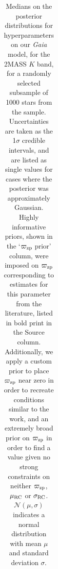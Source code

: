 \documentclass[fleqn,usenatbib]{mnras}
\newcommand{\oozp}{\mbox{$\varpi_{\rm zp}$}\xspace}
\newcommand{\murc}{\mbox{$\mu_{\rm RC}$}\xspace}
\newcommand{\sigrc}{\mbox{$\sigma_{\rm RC}$}\xspace}
\newcommand{\gaia}{\emph{Gaia}\xspace}
\newcommand{\nnew}[1]{#1}
\begin{document}
\begin{table}
\begin{tabular}{llrrrrrr}
    \bottomrule
    \end{tabular}
\caption{Medians on the posterior distributions for hyperparameters on our \gaia model, for the 2MASS $K$ band, for a randomly selected subsample of 1000 stars from the  sample. Uncertainties are taken as \nnew{the 1$\sigma$ credible intervals}, and are listed as single values for cases where the posterior was approximately Gaussian. Highly informative priors, shown in the `\oozp prior' column, were imposed on \oozp corresponding to estimates for this parameter from the literature, listed in bold print in the Source column. Additionally, we apply a custom prior to place \oozp near zero in order to recreate conditions similar to the  work, and an extremely broad prior on \oozp in order to find a value given no strong constraints on neither \oozp, \murc or \sigrc. $\mathcal{N}(\mu, \sigma)$ indicates a normal distribution with mean $\mu$ and standard deviation $\sigma$.}
\label{tab:parallax_k}
\end{table}
\end{document}
